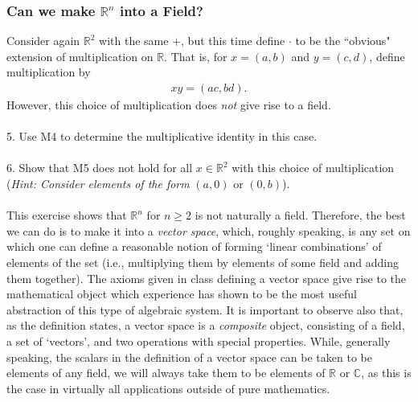 \documentclass[12pt,letterpaper,reqno]{article}
\numberwithin{equation}{section}
\begin{document}
\subsubsection*{Can we make $\mathbb{R}^n$ into a Field?}
Consider again $\mathbb{R}^2$ with the same $+$, but this time define $\cdot$ to be the ``obvious" extension of multiplication on $\mathbb{R}$. That is, for $x=(a,b)$ and $y=(c,d)$, define multiplication by
\begin{align*}
	xy=(ac,bd).
\end{align*}
However, this choice of multiplication does \emph{not} give rise to a field. \\
\\
5. Use M4 to determine the multiplicative identity in this case. \\
\\
6. Show that M5 does not hold for all $x \in \mathbb{R}^2$ with this choice of multiplication (\emph{Hint: Consider elements of the form} $(a,0)$ or $(0,b)$). \\
\\
This exercise shows that $\mathbb{R}^n$ for $n \geq 2$ is not naturally a field. Therefore, the best we can do is to make it into a \emph{vector space}, which, roughly speaking, is any set on which one can define a reasonable notion of forming `linear combinations' of elements of the set (i.e., multiplying them by elements of some field and adding them together). The axioms given in class defining a vector space give rise to the mathematical object which experience has shown to be the most useful abstraction of this type of algebraic system. It is important to observe also that, as the definition states, a vector space is a \emph{composite} object, consisting of a field, a set of `vectors', and two operations with special properties. While, generally speaking, the scalars in the definition of a vector space can be taken to be elements of any field, we will always take them to be elements of $\mathbb{R}$ or $\mathbb{C}$, as this is the case in virtually all applications outside of pure mathematics.
\end{document}
